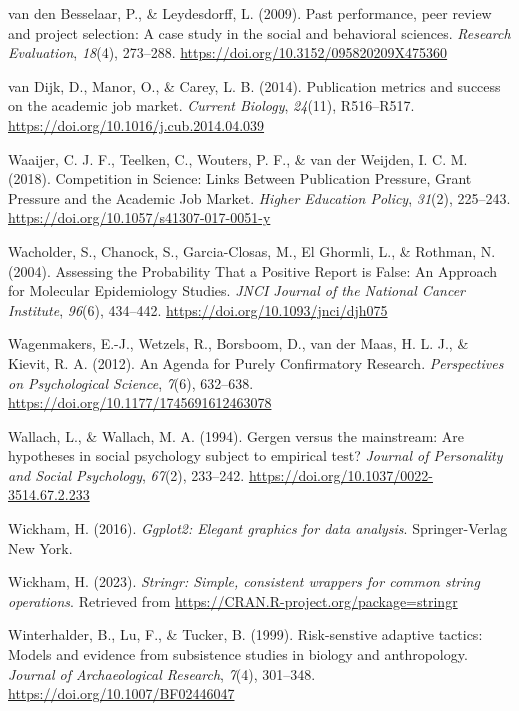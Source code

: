 \documentclass[
  british,
  a4paper,
  ,man,mask,floatsintext]{apa6}
\newlength{\cslhangindent}
\newenvironment{CSLReferences}[2] %
 {\begin{list}{}{%
  \setlength{\itemindent}{0pt}
  \setlength{\leftmargin}{0pt}
  \setlength{\parsep}{0pt}
  \ifodd #1
   \setlength{\leftmargin}{\cslhangindent}
   \setlength{\itemindent}{-1\cslhangindent}
  \fi
  \setlength{\itemsep}{#2\baselineskip}}}
 {\end{list}}
\begin{document}
\begin{CSLReferences}{1}{0}
van den Besselaar, P., \& Leydesdorff, L. (2009). Past performance, peer review and project selection: A case study in the social and behavioral sciences. \emph{Research Evaluation}, \emph{18}(4), 273--288. \url{https://doi.org/10.3152/095820209X475360}

van Dijk, D., Manor, O., \& Carey, L. B. (2014). Publication metrics and success on the academic job market. \emph{Current Biology}, \emph{24}(11), R516--R517. \url{https://doi.org/10.1016/j.cub.2014.04.039}

Waaijer, C. J. F., Teelken, C., Wouters, P. F., \& van der Weijden, I. C. M. (2018). Competition in {Science}: {Links Between Publication Pressure}, {Grant Pressure} and the {Academic Job Market}. \emph{Higher Education Policy}, \emph{31}(2), 225--243. \url{https://doi.org/10.1057/s41307-017-0051-y}

Wacholder, S., Chanock, S., Garcia-Closas, M., El Ghormli, L., \& Rothman, N. (2004). Assessing the {Probability That} a {Positive Report} is {False}: {An Approach} for {Molecular Epidemiology Studies}. \emph{JNCI Journal of the National Cancer Institute}, \emph{96}(6), 434--442. \url{https://doi.org/10.1093/jnci/djh075}

Wagenmakers, E.-J., Wetzels, R., Borsboom, D., van der Maas, H. L. J., \& Kievit, R. A. (2012). An {Agenda} for {Purely Confirmatory Research}. \emph{Perspectives on Psychological Science}, \emph{7}(6), 632--638. \url{https://doi.org/10.1177/1745691612463078}

Wallach, L., \& Wallach, M. A. (1994). Gergen versus the mainstream: {Are} hypotheses in social psychology subject to empirical test? \emph{Journal of Personality and Social Psychology}, \emph{67}(2), 233--242. \url{https://doi.org/10.1037/0022-3514.67.2.233}

Wickham, H. (2016). \emph{Ggplot2: {Elegant} graphics for data analysis}. Springer-Verlag New York.

Wickham, H. (2023). \emph{Stringr: Simple, consistent wrappers for common string operations}. Retrieved from \url{https://CRAN.R-project.org/package=stringr}

Winterhalder, B., Lu, F., \& Tucker, B. (1999). Risk-senstive adaptive tactics: {Models} and evidence from subsistence studies in biology and anthropology. \emph{Journal of Archaeological Research}, \emph{7}(4), 301--348. \url{https://doi.org/10.1007/BF02446047}


\end{CSLReferences}
\end{document}
